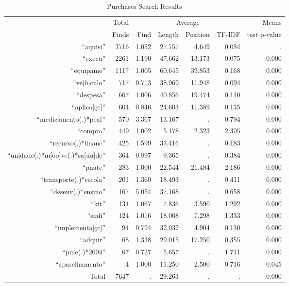 \begin{table}[!htbp]
  \caption{\label{tab:purchasesresults} Purchases Search Results}
  \centering
  \small
  \begin{tabular}{rrrrrrr}
  \hline

  \hline
  & Total & \multicolumn{4}{c}{Average} & Means \\ \cline{3-6}
  & Finds & Find & Length & Position & TF-IDF & test p-value \\
  \hline
  ``aquisi'' & 3716 & 1.052 & 27.757 & 4.649 & 0.084 & . \\
  ``execu'' & 2261 & 1.190 & 47.662 & 13.173 & 0.075 & 0.000 \\
  ``equipame'' & 1117 & 1.005 & 60.645 & 39.853 & 0.168 & 0.000 \\
  ``ve{[}íi{]}culo'' & 717 & 0.713 & 38.969 & 11.948 & 0.094 & 0.000 \\
  ``despesa'' & 667 & 1.006 & 40.856 & 19.474 & 0.110 & 0.000 \\
  ``aplica{[}çc{]}'' & 604 & 0.846 & 24.603 & 11.389 & 0.135 & 0.000 \\
  ``medicamento(.)*peaf'' & 570 & 3.367 & 13.167 & . & 0.794 & 0.000 \\
  ``compra'' & 449 & 1.002 & 5.178 & 2.323 & 2.305 & 0.000 \\
  ``recurso(.)*financ'' & 425 & 1.599 & 33.416 & . & 0.183 & 0.000 \\
  ``unidade(.)*m{[}óo{]}ve(.)*sa{[}úu{]}de'' & 364 & 0.897 & 9.365 & . & 0.384 & 0.000 \\
  ``pnate'' & 283 & 1.000 & 22.544 & 21.484 & 2.186 & 0.000 \\
  ``transporte(.)*escola'' & 201 & 1.360 & 18.493 & . & 0.411 & 0.000 \\
  ``desenv(.)*ensino'' & 167 & 5.054 & 37.168 & . & 0.658 & 0.000 \\
  ``kit'' & 134 & 1.067 & 7.836 & 3.590 & 1.292 & 0.000 \\
  ``siafi'' & 124 & 1.016 & 18.008 & 7.298 & 1.333 & 0.000 \\
  ``implementa{[}çc{]}'' & 94 & 0.794 & 32.032 & 4.904 & 0.130 & 0.000 \\
  ``adquir'' & 68 & 1.338 & 29.015 & 17.250 & 0.355 & 0.000 \\
  ``pme(.)*2004'' & 67 & 0.727 & 5.657 & . & 1.711 & 0.000 \\
  ``aparelhamento'' & 4 & 1.000 & 11.250 & 2.500 & 0.716 & 0.045 \\ \hline
   Total & 7647 & . & 29.263 & . & . & 0.000 \\
  \hline

  \hline
  \end{tabular}
\end{table}
